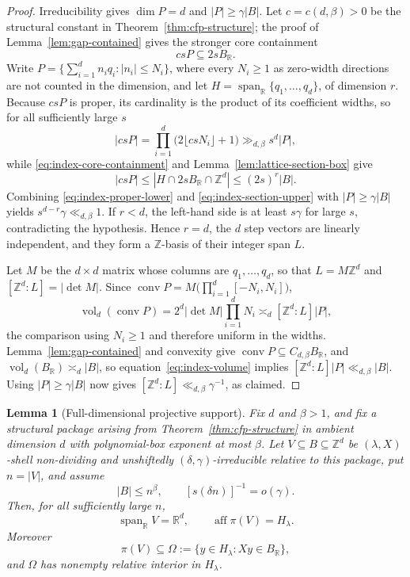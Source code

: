 \documentclass[11pt,reqno]{amsart}
\newtheorem{lemma}[theorem]{Lemma}
\theoremstyle{definition}
\theoremstyle{remark}
\newcommand{\Z}{\mathbb Z}
\newcommand{\R}{\mathbb R}
\newcommand{\Span}{\operatorname{span}}
\newcommand{\conv}{\operatorname{conv}}
\newcommand{\aff}{\operatorname{aff}}
\newcommand{\vol}{\operatorname{vol}}
\begin{document}
\begin{proof}
Irreducibility gives $\dim P=d$ and $|P|\ge\gamma|B|$.  Let
$c=c(d,\beta)>0$ be the structural constant in
Theorem~\ref{thm:cfp-structure}; the proof of
Lemma~\ref{lem:gap-contained} gives the stronger core containment
\begin{equation}
 csP\subseteq2sB_{\R}.
 \label{eq:index-core-containment}
\end{equation}
Write $P=\bigl\{\sum_{i=1}^d n_iq_i:|n_i|\le N_i\bigr\}$, where every
$N_i\ge1$ as zero-width directions are not counted in the dimension, and
let $H=\Span_{\R}\{q_1,\dots,q_d\}$, of dimension $r$.  Because $csP$ is
proper, its cardinality is the product of its coefficient widths, so for
all sufficiently large $s$
\begin{equation}
 |csP|
 =\prod_{i=1}^d\bigl(2\lfloor csN_i\rfloor+1\bigr)
 \gg_{d,\beta}s^d|P|,
 \label{eq:index-proper-lower}
\end{equation}
while \eqref{eq:index-core-containment} and
Lemma~\ref{lem:lattice-section-box} give
\begin{equation}
 |csP|
 \le |H\cap2sB_{\R}\cap\Z^d|
 \le (2s)^r|B|.
 \label{eq:index-section-upper}
\end{equation}
Combining \eqref{eq:index-proper-lower} and
\eqref{eq:index-section-upper} with $|P|\ge\gamma|B|$ yields
$s^{d-r}\gamma\ll_{d,\beta}1$.  If $r<d$, the left-hand side is at least
$s\gamma$ for large $s$, contradicting the hypothesis.  Hence $r=d$, the
$d$ step vectors are linearly independent, and they form a $\Z$-basis of
their integer span $L$.

Let $M$ be the $d\times d$ matrix whose columns are $q_1,\dots,q_d$, so
that $L=M\Z^d$ and $[\Z^d:L]=|\det M|$.  Since
$\conv P=M\bigl(\prod_{i=1}^d[-N_i,N_i]\bigr)$,
\begin{equation}
 \vol_d(\conv P)
 =2^d|\det M|\prod_{i=1}^dN_i
 \asymp_d[\Z^d:L]|P|,
 \label{eq:index-volume}
\end{equation}
the comparison using $N_i\ge1$ and therefore uniform in the widths.
Lemma~\ref{lem:gap-contained} and convexity give
$\conv P\subseteq C_{d,\beta}B_{\R}$, and
$\vol_d(B_{\R})\asymp_d|B|$, so equation~\eqref{eq:index-volume} implies
$[\Z^d:L]|P|\ll_{d,\beta}|B|$.  Using $|P|\ge\gamma|B|$ now gives
$[\Z^d:L]\ll_{d,\beta}\gamma^{-1}$, as claimed.
\end{proof}

\begin{lemma}[Full-dimensional projective support]
\label{lem:projective-span}
Fix $d$ and $\beta>1$, and fix a structural package arising from
Theorem~\ref{thm:cfp-structure} in ambient dimension $d$ with polynomial-box
exponent at most $\beta$.  Let $V\subseteq B\subseteq\Z^d$ be
$(\lambda,X)$-shell non-dividing and unshiftedly
$(\delta,\gamma)$-irreducible relative to this package, put $n=|V|$, and
assume
\[
 |B|\le n^\beta,
 \qquad
 [s(\delta n)]^{-1}=o(\gamma).
\]
Then, for all sufficiently large $n$,
\[
 \Span_{\R}V=\R^d,
 \qquad
 \aff\pi(V)=H_\lambda.
\]
Moreover
\[
 \pi(V)\subseteq
 \Omega:=\{y\in H_\lambda:Xy\in B_{\R}\},
\]
and $\Omega$ has nonempty relative interior in $H_\lambda$.
\end{lemma}
\end{document}
